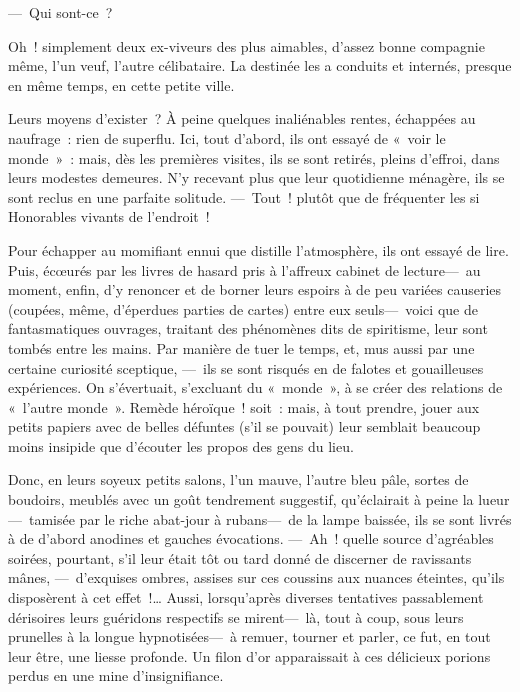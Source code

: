 \documentclass[french,twoside]{book} %
\begin{document}
— Qui sont-ce ?\par
Oh ! simplement deux ex-viveurs des plus aimables, d’assez bonne compagnie même, l’un veuf, l’autre célibataire. La destinée les a conduits et internés, presque en même temps, en cette petite ville.\par
Leurs moyens d’exister ? À peine quelques   inaliénables rentes, échappées au naufrage : rien de superflu. Ici, tout d’abord, ils ont essayé de « voir le monde » : mais, dès les premières visites, ils se sont retirés, pleins d’effroi, dans leurs modestes demeures. N’y recevant plus que leur quotidienne ménagère, ils se sont reclus en une parfaite solitude. — Tout ! plutôt que de fréquenter les si Honorables vivants de l’endroit !\par
Pour échapper au momifiant ennui que distille l’atmosphère, ils ont essayé de lire. Puis, écœurés par les livres de hasard pris à l’affreux cabinet de lecture— au moment, enfin, d’y renoncer et de borner leurs espoirs à de peu variées causeries (coupées, même, d’éperdues parties de cartes) entre eux seuls— voici que de fantasmatiques ouvrages, traitant des phénomènes dits de spiritisme, leur sont tombés entre les mains. Par manière de tuer le temps, et, mus aussi par une certaine curiosité sceptique, — ils se sont risqués en de falotes et gouailleuses expériences. On s’évertuait, s’excluant du « monde », à se créer des relations de « l’autre monde ». Remède héroïque ! soit : mais, à tout   prendre, jouer aux petits papiers avec de belles défuntes (s’il se pouvait) leur semblait beaucoup moins insipide que d’écouter les propos des gens du lieu.\par
Donc, en leurs soyeux petits salons, l’un mauve, l’autre bleu pâle, sortes de boudoirs, meublés avec un goût tendrement suggestif, qu’éclairait à peine la lueur— tamisée par le riche abat-jour à rubans— de la lampe baissée, ils se sont livrés à de d’abord anodines et gauches évocations. — Ah ! quelle source d’agréables soirées, pourtant, s’il leur était tôt ou tard donné de discerner de ravissants mânes, — d’exquises ombres, assises sur ces coussins aux nuances éteintes, qu’ils disposèrent à cet effet !… Aussi, lorsqu’après diverses tentatives passablement dérisoires leurs guéridons respectifs se mirent— là, tout à coup, sous leurs prunelles à la longue hypnotisées— à remuer, tourner et parler, ce fut, en tout leur être, une liesse profonde. Un filon d’or apparaissait à ces délicieux porions perdus en une mine d’insignifiance.\par
\end{document}
